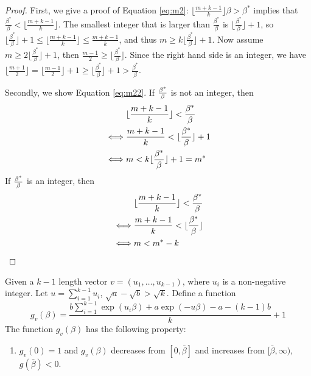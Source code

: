 \documentclass{article}
\begin{document}
\begin{proof}
	First, we give a proof of Equation \eqref{eq:m2}: $\lfloor \frac{m+k-1}{k} \rfloor \beta>\beta^\ast$
	implies that $\frac{\beta^\ast}{\beta}<\lfloor \frac{m+k-1}{k} \rfloor$.
	The smallest integer that is larger than $\frac{\beta^\ast}{\beta}$ is
	$\lfloor \frac{\beta^\ast}{\beta}\rfloor +1$,
	so $\lfloor \frac{\beta^\ast}{\beta} \rfloor + 1 \le \lfloor \frac{m+k-1}{k} \rfloor\le \frac{m+k-1}{k}$,
	and thus $m\ge k \Big\lfloor \frac{\beta^\ast}{\beta} \Big\rfloor +1$.
	Now assume $m\ge 2 \Big\lfloor \frac{\beta^\ast}{\beta} \Big\rfloor +1$,
	then $\frac{m-1}{2} \ge \lfloor \frac{\beta^\ast}{\beta} \rfloor$.
	Since the right hand side is an integer,
	we have $\lfloor \frac{m+1}{2} \rfloor = \lfloor \frac{m-1}{2} \rfloor +1 
	\ge \lfloor \frac{\beta^\ast}{\beta} \rfloor +1 >\frac{\beta^\ast}{\beta}$.
	
	Secondly, we show Equation \eqref{eq:m22}. If $\beta^\ast \over \beta$ is not an integer, then
	\begin{align*}
	& \lfloor \frac{m+k-1}{k} \rfloor < {\beta^\ast \over \beta}  \\
	\iff & \frac{m+k-1}{k}  < \lfloor{\beta^\ast \over \beta}\rfloor + 1 \\
	\iff & m < k \lfloor \frac{\beta^\ast}{\beta} \rfloor  + 1 = m^*
	\end{align*}
	If  $\beta^\ast \over \beta$ is an integer, then
	\begin{align*}
	& \lfloor  \frac{m+k-1}{k}  \rfloor < {\beta^\ast \over \beta}  \\
	\iff & \frac{m+k-1}{k}  < \lfloor{\beta^\ast \over \beta}\rfloor \\
	\iff & m <  m^* - k
	\end{align*}
\end{proof}
\begin{lemma}\label{lem:g_v_extension}
	Given a $k-1$ length vector $v=(u_1, \dots, u_{k-1})$, where $u_i$ is a non-negative integer.
	Let $u=\sum_{i=1}^{k-1} u_i$, $\sqrt{a} - \sqrt{b} > \sqrt{k}$.
	Define a function
	\begin{equation}\label{eq:gvbeta}
	g_v(\beta) = \frac{b\sum_{i=1}^{k-1}\exp(u_i \beta) + a \exp(-u\beta) - a - (k-1)b}{k}+1
	\end{equation}
	The function $g_v(\beta)$ has the following property:
	\begin{enumerate}
		\item $g_v(0)=1$ and $g_v(\beta)$ decreases from $[0, \bar{\beta}]$ and increases from
		$[\bar{\beta}, \infty)$, $g(\bar{\beta}) < 0$.
	\end{enumerate}
\end{lemma}
\end{document}
